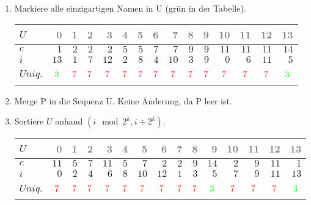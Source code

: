 \begin{enumerate}
\item 
Markiere alle einzigartigen Namen in U (grün in der Tabelle).
\begin{center}
\small\begin{tabular}{lrrrrrrrrrrrrrr}
    \toprule 
    $U$ & \textcolor{gray}{0} & \textcolor{gray}{1} & \textcolor{gray}{2} & \textcolor{gray}{3} & \textcolor{gray}{4} & \textcolor{gray}{5} & \textcolor{gray}{6} & \textcolor{gray}{7} & \textcolor{gray}{8} & \textcolor{gray}{9} & \textcolor{gray}{10} & \textcolor{gray}{11} & \textcolor{gray}{12} & \textcolor{gray}{13}\\
    \midrule 
    $c$ & $1$ & $2$ & $2$ & $2$ & $5$ & $5$ & $7$ & $7$ & $9$ & $9$ & $11$ & $11$ & $11$ & $14$ \\
    $i$ & $13$ & $1$ & $7$ & $12$ & $2$ & $8$ & $4$ & $10$ & $3$ & $9$ & $0$ & $6$ & $11$ & $5$ \\
    $Uniq.$ & $$\cmarkc$$ & $$\xmarkc$$ & $$\xmarkc$$ & $$\xmarkc$$ & $$\xmarkc$$ & $$\xmarkc$$ & $$\xmarkc$$ & $$\xmarkc$$ & $$\xmarkc$$ & $$\xmarkc$$ & $$\xmarkc$$ & $$\xmarkc$$ & $$\xmarkc$$ & $$\cmarkc$$ \\
    \bottomrule 
\end{tabular}
\end{center}

\item 
Merge P in die Sequenz U. Keine Änderung, da P leer ist.

\item 
Sortiere $U$ anhand $(i \mod 2^k, i \div 2^k)$.
\begin{center}
\small\begin{tabular}{lrrrrrrrrrrrrrr}
    \toprule 
    $U$ & \textcolor{gray}{0} & \textcolor{gray}{1} & \textcolor{gray}{2} & \textcolor{gray}{3} & \textcolor{gray}{4} & \textcolor{gray}{5} & \textcolor{gray}{6} & \textcolor{gray}{7} & \textcolor{gray}{8} & \textcolor{gray}{9} & \textcolor{gray}{10} & \textcolor{gray}{11} & \textcolor{gray}{12} & \textcolor{gray}{13}\\
    \midrule 
    $c$ & $11$ & $5$ & $7$ & $11$ & $5$ & $7$ & $2$ & $2$ & $9$ & $14$ & $2$ & $9$ & $11$ & $1$ \\
    $i$ & $0$ & $2$ & $4$ & $6$ & $8$ & $10$ & $12$ & $1$ & $3$ & $5$ & $7$ & $9$ & $11$ & $13$ \\
    $Uniq.$ & $$\xmarkc$$ & $$\xmarkc$$ & $$\xmarkc$$ & $$\xmarkc$$ & $$\xmarkc$$ & $$\xmarkc$$ & $$\xmarkc$$ & $$\xmarkc$$ & $$\xmarkc$$ & $$\cmarkc$$ & $$\xmarkc$$ & $$\xmarkc$$ & $$\xmarkc$$ & $$\cmarkc$$ \\
    \bottomrule 
\end{tabular}
\end{center}


\end{enumerate}
